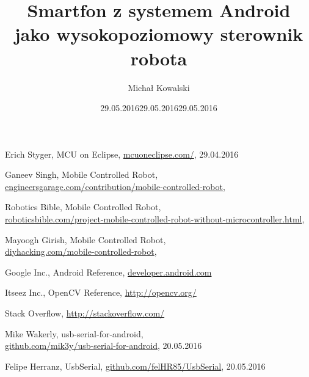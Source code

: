 \documentclass[openany]{mgr} %
\author{Michał Kowalski} %
\title{Smartfon z systemem Android\\jako wysokopoziomowy sterownik robota}
\begin{document}
\maketitle
\tableofcontents
\listoffigures











\begin{thebibliography}{9}

Erich Styger, MCU on Eclipse,
\url{mcuoneclipse.com/},
29.04.2016

Ganeev Singh, Mobile Controlled Robot,\\
\url{engineersgarage.com/contribution/mobile-controlled-robot},
\date{29.05.2016}

Robotics Bible, Mobile Controlled Robot,\\
\url{roboticsbible.com/project-mobile-controlled-robot-without-microcontroller.html},\\
\date{29.05.2016}

Mayoogh Girish, Mobile Controlled Robot,\\
\url{diyhacking.com/mobile-controlled-robot},
\date{29.05.2016}

Google Inc., Android Reference,
\url{developer.android.com}

Itseez Inc., OpenCV Reference,
\url{http://opencv.org/}

Stack Overflow,
\url{http://stackoverflow.com/}

Mike Wakerly, usb-serial-for-android,\\
\url{github.com/mik3y/usb-serial-for-android},
20.05.2016

Felipe Herranz, UsbSerial,
\url{github.com/felHR85/UsbSerial},
20.05.2016

\end{thebibliography}
\end{document}

